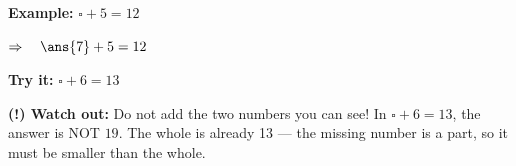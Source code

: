 \documentclass[12pt]{article}
\begin{document}
\begin{examplebox}
\textbf{Example:} \quad $\square + 5 = 12$

$\Rightarrow\quad \ans{7} + 5 = 12$
\end{examplebox}

\begin{tryitbox}
\textbf{Try it:} \quad $\square + 6 = 13$\\[2pt]
\end{tryitbox}

\begin{watchoutbox}
\textbf{(!) Watch out:} Do not add the two numbers you can see! In
$\square + 6 = 13$, the answer is NOT $19$. The whole is already 13 --- the
missing number is a part, so it must be smaller than the whole.
\end{watchoutbox}
\end{document}
